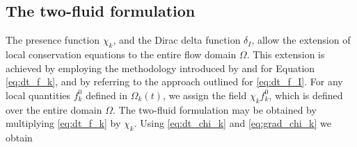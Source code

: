 \subsection{The two-fluid formulation}
The presence function $\chi_k$, and the Dirac delta function $\delta_I$, allow the extension of local conservation equations to the entire flow domain $\Omega$. This extension is achieved by employing the methodology introduced by \citet{drew1983mathematical} and \citet{kataoka1986local} for Equation \ref{eq:dt_f_k}, and by referring to the approach outlined \citet[Appendix 2]{marle1982macroscopic} for \ref{eq:dt_f_I}. %
For any local quantities $f_k^0$ defined in $\Omega_k(t)$, we assign the field $\chi_k f_k^0$, which is defined over the entire domain $\Omega$. The two-fluid formulation may be obtained by multiplying \ref{eq:dt_f_k} by $\chi_k$. Using \ref{eq:dt_chi_k} and \ref{eq:grad_chi_k} we obtain

